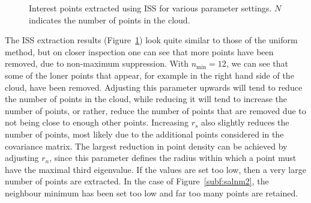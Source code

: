 \documentclass[11pt,a4paper]{kth-mag}
\begin{document}
\begin{figure}
{  }
  \centerline{
  }
  \caption{Interest points extracted using ISS for various parameter settings.
    $N$ indicates the number of points in the cloud.}
  \label{fig:intiss}
\end{figure}

The ISS extraction results (Figure~\ref{fig:intiss}) look quite similar to those
of the uniform method, but on closer inspection one can see that more points
have been removed, due to non-maximum suppression. With $n_{\min}=12$, we can
see that some of the loner points that appear, for example in the right hand
side of the cloud, have been removed. Adjusting this parameter upwards will tend
to reduce the number of points in the cloud, while reducing it will tend to
increase the number of points, or rather, reduce the number of points that are
removed due to not being close to enough other points. Increasing $r_s$ also
slightly reduces the number of points, most likely due to the additional points
considered in the covariance matrix. The largest reduction in point density can
be achieved by adjusting $r_n$, since this parameter defines the radius within
which a point must have the maximal third eigenvalue. If the values are set too
low, then a very large number of points are extracted. In the case of
Figure~\ref{subf:salnm2}, the neighbour minimum has been set too low and far too
many points are retained.
\end{document}
